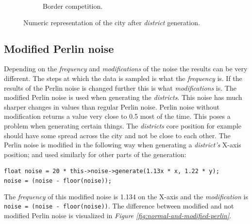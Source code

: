 \begin{figure}[h]
\begin{subfigure}{0.5\textwidth}
			\caption{Border competition.}
			\label{fig:map-borders}
		\end{subfigure}
		\caption{Numeric representation of the city after \textit{district} generation.}
		\label{fig:map-districts-and-borders}
	\end{figure}
		
	\subsection{Modified Perlin noise}
	Depending on the \textit{frequency} and \textit{modifications} of the noise the results can be very different. The steps at which the data is sampled is what the \textit{frequency} is. If the results of the Perlin noise is changed further this is what \textit{modifications} is. The modified Perlin noise is used when generating the \textit{districts}. This noise has much sharper changes in values than regular Perlin noise. Perlin noise without modification returns a value very close to 0.5 most of the time. This poses a problem when generating certain things. The \textit{districts} core position for example should have some spread across the city and not be close to each other. The Perlin noise is modified in the following way when generating a \textit{district's} X-axis position; and used similarly for other parts of the generation:
		
	\texttt{float noise = 20 * this->noise->generate(1.13x * x, 1.22 * y);\\
		noise = (noise - floor(noise));}
		
	The \textit{frequency} of this modified noise is 1.134 on the X-axis and the \textit{modification} is \texttt{noise = (noise - floor(noise))}.
	The difference between modified and not modified Perlin noise is visualized in \textit{Figure \ref{fig:normal-and-modified-perlin}}.
		
